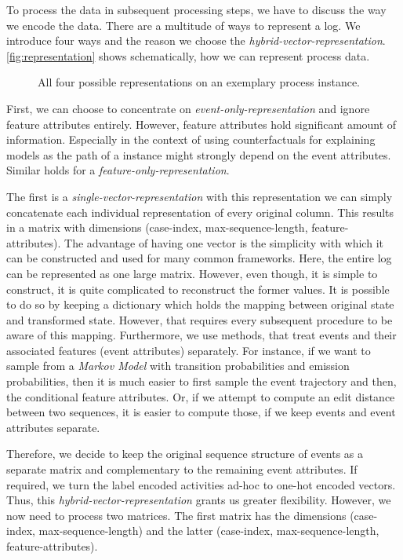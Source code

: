 \documentclass[./../../paper.tex]{subfiles}
\begin{document}
To process the data in subsequent processing steps, we have to discuss the way we encode the data. There are a multitude of ways to represent a log. We introduce four ways and the reason we choose the \emph{hybrid-vector-representation}. \autoref{fig:representation} shows schematically, how we can represent process data. 

\begin{figure}[htbp]
    \centering
    
    
    \caption{All four possible representations on an exemplary process instance.}
    \label{fig:representation}
\end{figure}


First, we can choose to concentrate on \emph{event-only-representation} and ignore feature attributes entirely. However, feature attributes hold significant amount of information. Especially in the context of using counterfactuals for explaining models as the path of a \gls{instance} might strongly depend on the event attributes. Similar holds for a \emph{feature-only-representation}.

The first is a \emph{single-vector-representation} with this representation we can simply concatenate each individual representation of every original column. This results in a matrix with dimensions (case-index, max-sequence-length, feature-attributes). The advantage of having one vector is the simplicity with which it can be constructed and used for many common frameworks. Here, the entire log can be represented as one large matrix. However, even though, it is simple to construct, it is quite complicated to reconstruct the former values. It is possible to do so by keeping a dictionary which holds the mapping between original state and transformed state. However, that requires every subsequent procedure to be aware of this mapping. Furthermore, we use methods, that treat events and their associated features (event attributes) separately. For instance, if we want to sample from a \emph{Markov Model} with transition probabilities and emission probabilities, then it is much easier to first sample the event trajectory and then, the conditional feature attributes. Or, if we attempt to compute an edit distance between two sequences, it is easier to compute those, if we keep events and event attributes separate.

Therefore, we decide to keep the original sequence structure of events as a separate matrix and complementary to the remaining event attributes. If required, we turn the label encoded activities ad-hoc to one-hot encoded vectors. Thus, this \emph{hybrid-vector-representation} grants us greater flexibility. However, we now need to process two matrices. The first matrix has the dimensions (case-index, max-sequence-length) and the latter (case-index, max-sequence-length, feature-attributes). 
\end{document}
